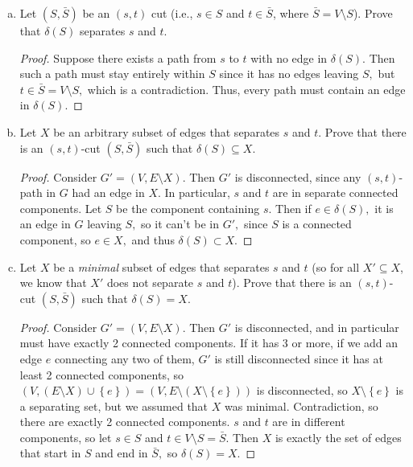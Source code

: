\documentclass{article}
\begin{document}
\begin{enumerate}[(a), resume]
	\item Let $(S, \bar S)$ be an $(s,t)$ cut (i.e., $s \in S$ and $t \in \bar S$, where $\bar S = V \setminus S$).  Prove that $\delta(S)$ separates $s$ and $t$.
		\begin{proof}
			Suppose there exists a path from $s$ to $t$ with no edge in $\delta(S).$ Then such a path must stay entirely within $S$ since it has no edges leaving $S,$ but $t\in \bar S=V\setminus S,$ which is a contradiction. Thus, every path must contain an edge in $\delta(S).$
		\end{proof}

	\item Let $X$ be an arbitrary subset of edges that separates $s$ and $t$. Prove that there is an $(s, t)$-cut $(S, \bar S)$ such that $\delta(S) \subseteq X$.
		\begin{proof}
			Consider $G'=(V, E\setminus X).$ Then $G'$ is disconnected, since any $(s, t)$-path in $G$ had an edge in $X.$ In particular, $s$ and $t$ are in separate connected components. Let $S$ be the component containing $s.$ Then if $e\in \delta(S),$ it is an edge in $G$ leaving $S,$ so it can't be in $G',$ since $S$ is a connected component, so $e\in X,$ and thus $\delta(S)\subset X.$
		\end{proof}

	\item Let $X$ be a \emph{minimal} subset of edges that separates $s$ and $t$ (so for all $X' \subseteq X$, we know that $X'$ does not separate $s$ and $t$).  Prove that there is an $(s, t)$-cut $(S,\bar S)$ such that $\delta(S) = X$.
		\begin{proof}
			Consider $G'=(V, E\setminus X).$ Then $G'$ is disconnected, and in particular must have exactly 2 connected components. If it has 3 or more, if we add an edge $e$ connecting any two of them, $G'$ is still disconnected since it has at least 2 connected components, so $(V, (E\setminus X)\cup \left\{ e \right\}) = (V, E\setminus(X\setminus \left\{ e \right\}))$ is disconnected, so $X\setminus\left\{ e \right\}$ is a separating set, but we assumed that $X$ was minimal. Contradiction, so there are exactly 2 connected components. $s$ and $t$ are in different components, so let $s\in S$ and $t\in V\setminus S = \bar S.$ Then $X$ is exactly the set of edges that start in $S$ and end in $\bar S,$ so $\delta(S)=X.$
		\end{proof}

\end{enumerate}
\end{document}
